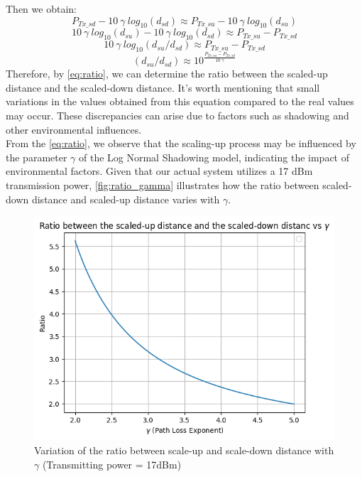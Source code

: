 \noindent Then we obtain:
\begin{equation}
    P_{Tx\_sd} - 10 \: \gamma \: log_{10}(d_{sd}) \approx P_{Tx\_su} - 10 \: \gamma \: log_{10}(d_{su})
\end{equation}
\begin{equation}
    10 \: \gamma \: log_{10}(d_{su}) - 10 \: \gamma \: log_{10}(d_{sd}) \approx P_{Tx\_su} - P_{Tx\_sd}
\end{equation}
\begin{equation}
    10 \: \gamma \: log_{10}(d_{su}/d_{sd}) \approx P_{Tx\_su} - P_{Tx\_sd}
\end{equation}
\begin{equation}
    (d_{su}/d_{sd}) \approx 10 ^ {\frac{P_{Tx\_su} - P_{Tx\_sd}}{10 \: \gamma}}
    \label{eq:ratio}
\end{equation}
\hspace{12pt} Therefore, by \autoref{eq:ratio}, we can determine the ratio between the scaled-up distance and the scaled-down distance. It's worth mentioning that small variations in the values obtained from this equation compared to the real values may occur. These discrepancies can arise due to factors such as shadowing and other environmental influences.\\

From the \autoref{eq:ratio}, we observe that the scaling-up process may be influenced by the parameter \( \gamma \) of the Log Normal Shadowing model, indicating the impact of environmental factors. Given that our actual system utilizes a 17 dBm transmission power, \autoref{fig:ratio_gamma} illustrates how the ratio between scaled-down distance and scaled-up distance varies with \( \gamma \).
\begin{figure}
    \centering
    \includegraphics[width=0.8\linewidth]{images/ratio_vs_gamma.png}
    \caption{Variation of the ratio between scale-up and scale-down distance with $\gamma$ (Transmitting power = 17dBm)}
    \label{fig:ratio_gamma}
\end{figure}

